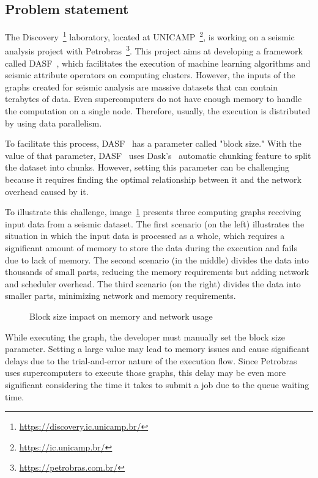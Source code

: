 \subsection{Problem statement}
\label{subsec:problem-statement}

The Discovery~\footnote{\url{https://discovery.ic.unicamp.br/}} laboratory, located at \ac{UNICAMP}~\footnote{\url{https://ic.unicamp.br/}}, is working on a seismic analysis project with Petrobras~\footnote{\url{https://petrobras.com.br/}}.
This project aims at developing a framework called \ac{DASF}~\cite{dasf}, which facilitates the execution of machine learning algorithms and seismic attribute operators on computing clusters.
However, the inputs of the graphs created for seismic analysis are massive datasets that can contain terabytes of data.
Even supercomputers do not have enough memory to handle the computation on a single node.
Therefore, usually, the execution is distributed by using data parallelism.

To facilitate this process, \ac{DASF}~\cite{dasf} has a parameter called "block size."
With the value of that parameter, \ac{DASF}~\cite{dasf} uses Dask's~\cite{dask} automatic chunking feature to split the dataset into chunks.
However, setting this parameter can be challenging because it requires finding the optimal relationship between it and the network overhead caused by it.

To illustrate this challenge, image~\ref{fig:block-size} presents three computing graphs receiving input data from a seismic dataset.
The first scenario (on the left) illustrates the situation in which the input data is processed as a whole, which requires a significant amount of memory to store the data during the execution and fails due to lack of memory.
The second scenario (in the middle) divides the data into thousands of small parts, reducing the memory requirements but adding network and scheduler overhead.
The third scenario (on the right) divides the data into smaller parts, minimizing network and memory requirements.

\begin{figure}[ht]
  \caption{Block size impact on memory and network usage}
  \label{fig:block-size}
\end{figure}

While executing the graph, the developer must manually set the block size parameter.
Setting a large value may lead to memory issues and cause significant delays due to the trial-and-error nature of the execution flow.
Since Petrobras uses supercomputers to execute those graphs, this delay may be even more significant considering the time it takes to submit a job due to the queue waiting time.

